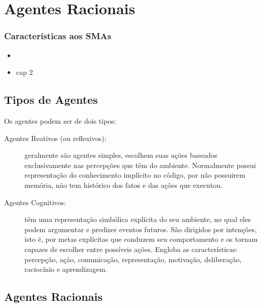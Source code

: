 


\section{Agentes Racionais}
\begin{frame}

    \frametitle{Características aos SMAs}
    \begin{itemize}
    \pause
      \item 
\pause
      \item cap 2
    
    \end{itemize}
\end{frame}

\subsection{Tipos de Agentes}
\begin{frame}

Os agentes podem ser de dois tipos:
\begin{description}

 \item[Agentes Reativos (ou reflexivos):] geralmente são agentes simples, escolhem suas ações baseados exclusivamente nas percepções que têm do ambiente. Normalmente possui representação do conhecimento implícito  no código, por não  possuirem
  memória, não tem histórico dos fatos  e das ações que executou.

  \item[Agentes Cognitivos:]  têm uma representação simbólica explícita do seu ambiente, no qual eles podem argumentar e predizer eventos futuros. São dirigidos por intenções, isto é, por metas explícitas que conduzem seu comportamento e os tornam capazes de escolher entre possíveis ações. 
  Engloba as características: percepção, ação, comunicação, representação, 
  motivação, deliberação, raciocínio e aprendizagem. 

\end{description}

\end{frame}


\subsection{Agentes Racionais}

